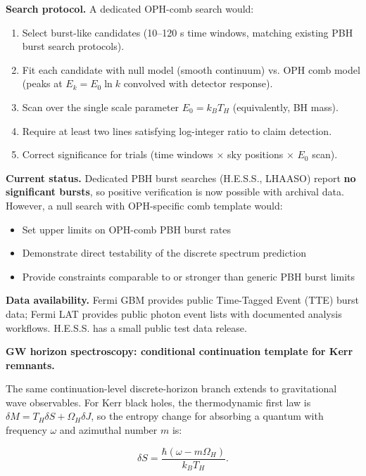 \textbf{Search protocol.} A dedicated OPH-comb search would:

\begin{enumerate}
\def\labelenumi{\arabic{enumi}.}
\tightlist
\item
  Select burst-like candidates (10--120 s time windows, matching existing PBH burst search protocols).
\item
  Fit each candidate with null model (smooth continuum) vs. OPH comb model (peaks at \(E_k = E_0 \ln k\) convolved with detector response).
\item
  Scan over the single scale parameter \(E_0 = k_B T_H\) (equivalently, BH mass).
\item
  Require at least two lines satisfying log-integer ratio to claim detection.
\item
  Correct significance for trials (time windows \(\times\) sky positions \(\times\) \(E_0\) scan).
\end{enumerate}

\textbf{Current status.} Dedicated PBH burst searches (H.E.S.S., LHAASO) report \textbf{no significant bursts}, so positive verification is now possible with archival data. However, a null search with OPH-specific comb template would:

\begin{itemize}
\tightlist
\item
  Set upper limits on OPH-comb PBH burst rates
\item
  Demonstrate direct testability of the discrete spectrum prediction
\item
  Provide constraints comparable to or stronger than generic PBH burst limits
\end{itemize}

\textbf{Data availability.} Fermi GBM provides public Time-Tagged Event (TTE) burst data; Fermi LAT provides public photon event lists with documented analysis workflows. H.E.S.S. has a small public test data release.

\textbf{GW horizon spectroscopy: conditional continuation template for Kerr remnants.}

The same continuation-level discrete-horizon branch extends to gravitational wave observables. For Kerr black holes, the thermodynamic first law is \(\delta M = T_H \delta S +
\Omega_H \delta J\), so the entropy change for absorbing a quantum with frequency \(\omega\) and azimuthal number \(m\) is:

\[
\delta S = \frac{\hbar(\omega - m\Omega_H)}{k_B T_H}.
\]


